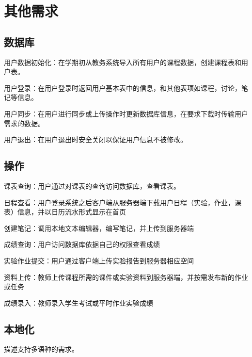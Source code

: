 \chapter{其他需求}

\section{数据库}

用户数据初始化：在学期初从教务系统导入所有用户的课程数据，创建课程表和用户表。

用户登录：在用户登录时返回用户基本表中的信息，和其他表项如课程，讨论，笔记等信息。

用户同步：在用户进行同步或上传操作时更新数据库信息，在要求下载时传输用户需求的数据。

用户退出：在用户退出时安全关闭以保证用户信息不被修改。


\section{操作}

课表查询：用户通过对课表的查询访问数据库，查看课表。

日程查看：用户登录系统之后客户端从服务器端下载用户日程（实验，作业，课表）信息，并以日历流水形式显示在首页

创建笔记：调用本地文本编辑器，编写笔记，并上传到服务器端

成绩查询：用户访问数据库依据自己的权限查看成绩

实验作业提交：用户通过客户端上传实验报告到服务器相应空间

资料上传：教师上传课程所需的课件或实验资料到服务器端，并按需发布新的作业或任务

成绩录入：教师录入学生考试或平时作业实验成绩

\section{本地化}

描述支持多语种的需求。
